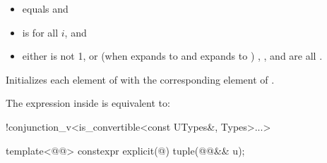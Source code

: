 \documentclass{wg21}
\begin{document}
\begin{itemdescr}
    \pnum
    \constraints
    \begin{itemize}
        \item
         equals  and

        \item
         is  for all $i$, and

        \item
        either
         is not 1, or
        (when  expands to  and  expands to )
        , , and  are all .
    \end{itemize}

    \pnum
    \effects
    Initializes each element of 
    with the corresponding element of .

    \pnum
    \remarks
    The expression inside  is equivalent to:
    \begin{codeblock}
        !conjunction_v<is_convertible<const UTypes&, Types>...>
    \end{codeblock}
\end{itemdescr}

%
\begin{itemdecl}
template<@@>
constexpr explicit(@\seebelow@) tuple(@@&& u);
\end{itemdecl}
\end{document}
